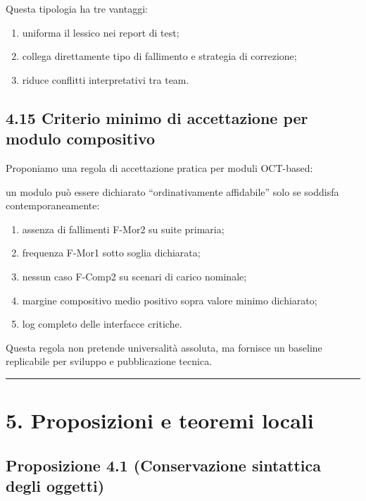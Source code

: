 Questa tipologia ha tre vantaggi:

\begin{enumerate}
\def\labelenumi{\arabic{enumi}.}
\tightlist
\item
  uniforma il lessico nei report di test;
\item
  collega direttamente tipo di fallimento e strategia di correzione;
\item
  riduce conflitti interpretativi tra team.
\end{enumerate}

\subsection{4.15 Criterio minimo di accettazione per modulo compositivo}

Proponiamo una regola di accettazione pratica per moduli OCT-based:

un modulo può essere dichiarato ``ordinativamente affidabile'' solo se soddisfa contemporaneamente:

\begin{enumerate}
\def\labelenumi{\arabic{enumi}.}
\tightlist
\item
  assenza di fallimenti F-Mor2 su suite primaria;
\item
  frequenza F-Mor1 sotto soglia dichiarata;
\item
  nessun caso F-Comp2 su scenari di carico nominale;
\item
  margine compositivo medio positivo sopra valore minimo dichiarato;
\item
  log completo delle interfacce critiche.
\end{enumerate}

Questa regola non pretende universalità assoluta, ma fornisce un baseline replicabile per sviluppo e pubblicazione tecnica.

\begin{center}\rule{0.5\linewidth}{0.5pt}\end{center}

\section{5. Proposizioni e teoremi locali}

\subsection{Proposizione 4.1 (Conservazione sintattica degli oggetti)}

